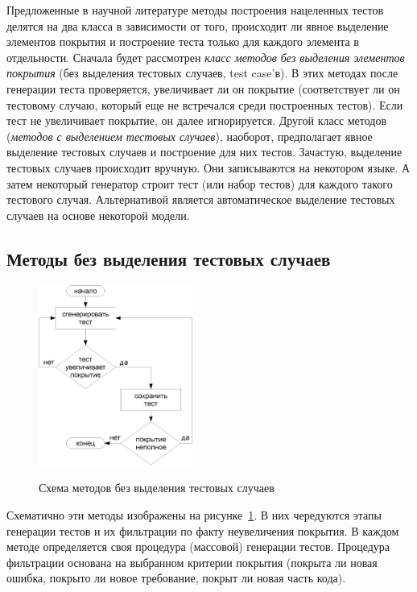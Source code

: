 \documentclass[14pt]{extreport}
\begin{document}
Предложенные в научной литературе методы построения нацеленных тестов делятся на два класса в зависимости от того, происходит ли явное выделение элементов покрытия и построение теста только для каждого элемента в отдельности. Сначала будет рассмотрен \emph{класс методов без выделения элементов покрытия} (без выделения тестовых случаев, test case'в). В этих методах после генерации теста проверяется, увеличивает ли он покрытие (соответствует ли он тестовому случаю, который еще не встречался среди построенных тестов). Если тест не увеличивает покрытие, он далее игнорируется. Другой класс методов (\emph{методов с выделением тестовых случаев}), наоборот, предполагает явное выделение тестовых случаев и построение для них тестов. Зачастую, выделение тестовых случаев происходит вручную. Они записываются на некотором языке. А затем некоторый генератор строит тест (или набор тестов) для каждого такого тестового случая. Альтернативой является автоматическое выделение тестовых случаев на основе некоторой модели.

\subsection{Методы без выделения тестовых случаев}

\begin{figure}[h] \center
  \includegraphics[width=0.45\textwidth]{1.review/methods1}\\
  \caption{Схема методов без выделения тестовых случаев}\label{fig:methods1}
\end{figure}

Схематично эти методы изображены на рисунке~\ref{fig:methods1}. В них чередуются этапы генерации тестов и их фильтрации по факту неувеличения покрытия. В каждом методе определяется своя процедура (массовой) генерации тестов. Процедура фильтрации основана на выбранном критерии покрытия (покрыта ли новая ошибка, покрыто ли новое требование, покрыт ли новая часть кода).
\end{document}
